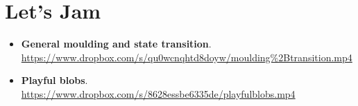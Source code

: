 \section{Let's Jam}
\label{app:videos:jamming}

\begin{itemize}
	\item{\textbf{General moulding and state transition}. \\
		\url{https://www.dropbox.com/s/qu0wcnqhtd8doyw/moulding%2Btransition.mp4} } 
	\item{\textbf{Playful blobs}. \\
		\url{https://www.dropbox.com/s/8628essbe6335de/playfulblobs.mp4} } 
\end{itemize}